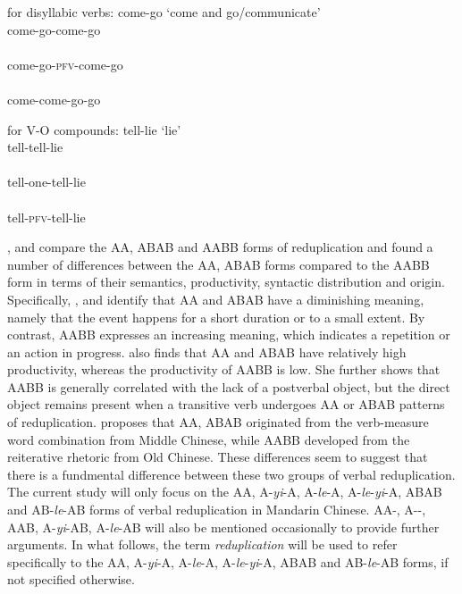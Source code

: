 \ex\label{ex:forms-di} for disyllabic verbs:  come-go `come and go/communicate'
		\ea \gll {}\\
		come-go-come-go\\ 
		\ex \gll {}\\
		come-go-\textsc{pfv}-come-go\\ 
		\ex \gll {}\\
		come-come-go-go\\ 
		\z

\ex\label{ex:forms-vo} for V-O compounds:  tell-lie `lie'
		\ea \gll {}\\
		tell-tell-lie\\ 
		\ex \gll {}\\
		tell-one-tell-lie\\ 
		\ex \gll {}\\
		tell-\textsc{pfv}-tell-lie\\ 
		\z
\z




 \citet{Fan1964}, \citet{Arcodiaetal2014}  and \citet{Xie2020} compare the AA, ABAB and AABB forms of reduplication 
and found a number of differences between the AA, ABAB forms compared to the AABB form in terms of their semantics, productivity, syntactic distribution and origin. 
Specifically, \citet[17--18]{Arcodiaetal2014}, \citet[144]{MelloniBasciano2018} and \citet[90]{Xie2020} identify that AA and ABAB have a diminishing meaning, 
namely that the event happens for a short duration or to a small extent. 
By contrast, AABB expresses an increasing meaning, which indicates a repetition or an action in progress. 
\citet[Sec. 3.1]{Xie2020} also finds that AA and ABAB have relatively high productivity, 
whereas the productivity of AABB is low. 
She further shows that AABB is generally correlated with the lack of a postverbal object, but the direct object remains present when a transitive verb undergoes AA or ABAB patterns of reduplication. 
\citet[277]{Fan1964} proposes that AA, ABAB originated from the verb-measure word combination from Middle Chinese, 
while AABB developed from the reiterative rhetoric from Old Chinese. 
These differences seem to suggest that there is a fundmental difference between these two groups of verbal reduplication. 
The current study will only focus on the AA, A-\textit{yi}-A, A-\textit{le}-A, A-\textit{le}-\textit{yi}-A, ABAB and AB-\textit{le}-AB forms of verbal reduplication in Mandarin Chinese.
AA-, A--, AAB, A-\textit{yi}-AB, A-\textit{le}-AB will also be mentioned occasionally to provide further arguments.
In what follows, the term \textit{reduplication} will be used  to refer specifically to the AA, A\hyp{}\textit{yi}\hyp{}A, A-\textit{le}-A, A-\textit{le}-\textit{yi}-A, ABAB and AB-\textit{le}-AB forms, if not specified otherwise.




